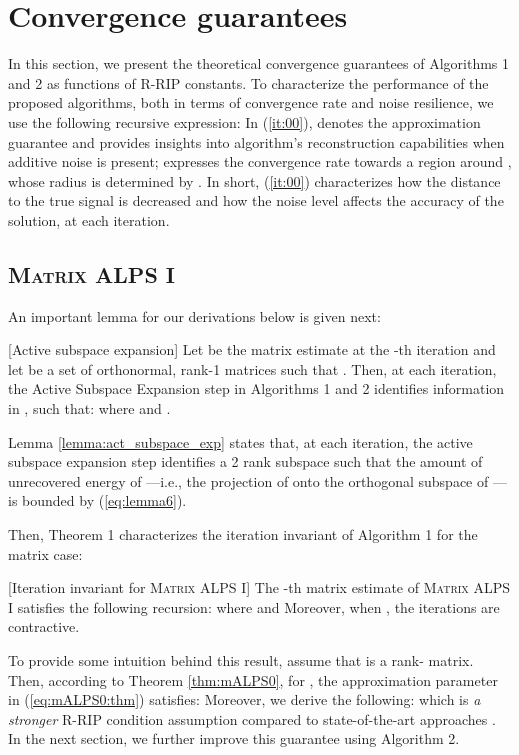 \documentclass[twocolumn]{svjour3}
\begin{document}
\section{Convergence guarantees}{\label{section:convergence}}

In this section, we present the theoretical convergence guarantees of Algorithms 1 and 2 as functions of R-RIP constants. 
To characterize the performance of the proposed algorithms, both in terms of convergence rate and noise resilience, we use the following recursive expression:
 In (\ref{it:00}),  denotes the approximation guarantee and provides insights into algorithm's reconstruction capabilities when additive noise is present;  expresses the convergence rate towards a region around , whose radius is determined by . In short, (\ref{it:00}) characterizes how the distance to the true signal  is decreased and how the noise level affects the accuracy of the solution, at each iteration.

\subsection{\textsc{Matrix ALPS I}}
An important lemma for our derivations below is given next:

\begin{lemma}\label{lemma:act_subspace_exp}[Active subspace expansion] Let  be the matrix estimate at the -th iteration and let  be a set of orthonormal, rank-1 matrices such that .  Then, at each iteration, the Active Subspace Expansion step in Algorithms 1 and 2 identifies information in , such that:
 where  and .
\end{lemma}

Lemma \ref{lemma:act_subspace_exp} states that, at each iteration, the active subspace expansion step identifies a 2 rank subspace such that the amount of unrecovered energy of ---i.e., the projection of  onto the orthogonal subspace of ---is bounded by (\ref{eq:lemma6}).

Then, Theorem 1 characterizes the iteration invariant of Algorithm 1 for the matrix case:
\begin{theorem}\label{thm:mALPS0}[Iteration invariant for \textsc{Matrix ALPS I}] The -th matrix estimate  of \textsc{Matrix ALPS I} satisfies the following recursion:
 where  and  Moreover, when , the iterations are contractive.
\end{theorem}

To provide some intuition behind this result, assume that  is a rank- matrix. Then, according to Theorem \ref{thm:mALPS0}, for , the approximation parameter  in (\ref{eq:mALPS0:thm}) satisfies:
 Moreover, we derive the following:
 which is {\it a stronger} R-RIP condition assumption compared to state-of-the-art approaches \cite{admira2010}. In the next section, we further improve this guarantee using Algorithm 2.
\end{document}
